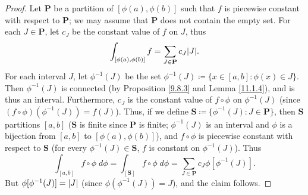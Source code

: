 \begin{proof}
    Let \(\mathbf{P}\) be a partition of \([\phi(a), \phi(b)]\) such that \(f\) is piecewise constant with respect to \(\mathbf{P}\);
    we may assume that \(\mathbf{P}\) does not contain the empty set.
    For each \(J \in \mathbf{P}\), let \(c_J\) be the constant value of \(f\) on \(J\), thus
    \[
        \int_{[\phi(a), \phi(b)]} f = \sum_{J \in \mathbf{P}} c_J \abs*{J}.
    \]
    For each interval \(J\), let \(\phi^{-1}(J)\) be the set \(\phi^{-1}(J) \coloneqq \{x \in [a, b] : \phi(x) \in J\}\).
    Then \(\phi^{-1}(J)\) is connected (by Proposition \ref{9.8.3} and Lemma \ref{11.1.4}), and is thus an interval.
    Furthermore, \(c_J\) is the constant value of \(f \circ \phi\) on \(\phi^{-1}(J)\) (since \((f \circ \phi)(\phi^{-1}(J)) = f(J)\)).
    Thus, if we define \(\mathbf{S} \coloneqq \{\phi^{-1} (J) : J \in \mathbf{P}\}\), then \(\mathbf{S}\) partitions \([a, b]\)
    (\(\mathbf{S}\) is finite since \(\mathbf{P}\) is finite;
    \(\phi^{-1}(J)\) is an interval and \(\phi\) is a bijection from \([a, b]\) to \([\phi(a), \phi(b)]\)),
    and \(f \circ \phi\) is piecewise constant with respect to \(\mathbf{S}\) (for every \(\phi^{-1}(J) \in \mathbf{S}\), \(f\) is constant on \(\phi^{-1}(J)\)).
    Thus
    \[
        \int_{[a, b]} f \circ \phi \; d \phi = \int_{[\mathbf{S}]} f \circ \phi \; d \phi = \sum_{J \in \mathbf{P}} c_J \phi[\phi^{-1}(J)].
    \]
    But \(\phi[\phi^{-1}(J)] = \abs*{J}\) (since \(\phi(\phi^{-1}(J)) = J\)), and the claim follows.
\end{proof}